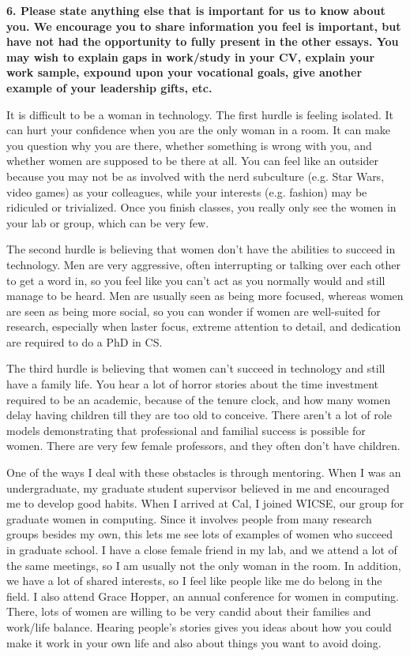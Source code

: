 \documentclass{article}
\begin{document}
\pagestyle{plain}

\noindent\textbf{6.  Please state anything else that is important for us to know about you. We encourage you to share information you feel is important, but have not had the opportunity to fully present in the other essays. You may wish to explain gaps in work/study in your CV, explain your work sample, expound upon your vocational goals, give another example of your leadership gifts, etc.}

It is difficult to be a woman in technology.
The first hurdle is feeling isolated.
It can hurt your confidence when you are the only woman in a room.
It can make you question why you are there, whether something is wrong with you, and whether women are supposed to be there at all.
You can feel like an outsider because you may not be as involved with the nerd subculture (e.g. Star Wars, video games) as your colleagues, while your interests (e.g. fashion) may be ridiculed or trivialized.
Once you finish classes, you really only see the women in your lab or group, which can be very few.

The second hurdle is believing that women don't have the abilities to succeed in technology.
Men are very aggressive, often interrupting or talking over each other to get a word in, so you feel like you can't act as you normally would and still manage to be heard.
Men are usually seen as being more focused, whereas women are seen as being more social, so you can wonder if women are well-suited for research, especially when laster focus, extreme attention to detail, and dedication are required to do a PhD in CS.

The third hurdle is believing that women can't succeed in technology and still have a family life.
You hear a lot of horror stories about the time investment required to be an academic, because of the tenure clock, and how many women delay having children till they are too old to conceive.
There aren't a lot of role models demonstrating that professional and familial success is possible for women.
There are very few female professors, and they often don't have children.

One of the ways I deal with these obstacles is through mentoring.
When I was an undergraduate, my graduate student supervisor believed in me and encouraged me to develop good habits.
When I arrived at Cal, I joined WICSE, our group for graduate women in computing.
Since it involves people from many research groups besides my own, this lets me see lots of examples of women who succeed in graduate school.
I have a close female friend in my lab, and we attend a lot of the same meetings, so I am usually not the only woman in the room.
In addition, we have a lot of shared interests, so I feel like people like me do belong in the field.
I also attend Grace Hopper, an annual conference for women in computing.
There, lots of women are willing to be very candid about their families and work/life balance.
Hearing people's stories gives you ideas about how you could make it work in your own life and also about things you want to avoid doing.
\end{document}
